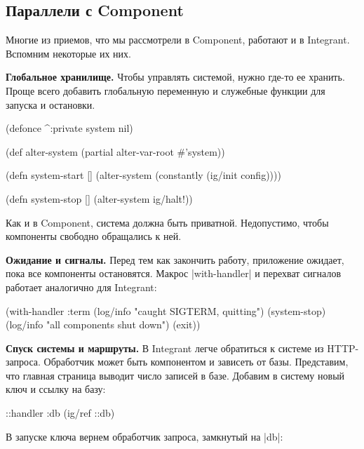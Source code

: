 \subsection{Параллели с Component}

Многие из приемов, что мы рассмотрели в Component, работают и в
Integrant. Вспомним некоторые их них.

\textbf{Глобальное хранилище.} Чтобы управлять системой, нужно где-то ее
хранить. Проще всего добавить глобальную переменную и служебные функции для
запуска и остановки.

\begin{english}
  \begin{clojure}
(defonce ^:private system nil)

(def alter-system (partial alter-var-root #'system))

(defn system-start []
  (alter-system (constantly (ig/init config))))

(defn system-stop []
  (alter-system ig/halt!))
  \end{clojure}
\end{english}

Как и в Component, система должна быть приватной. Недопустимо, чтобы
компоненты свободно обращались к ней.

\textbf{Ожидание и сигналы.} Перед тем как закончить работу, приложение ожидает,
пока все компоненты остановятся. Макрос \spverb|with-handler| и перехват
сигналов работает аналогично для Integrant:

\begin{english}
  \begin{clojure}
(with-handler :term
  (log/info "caught SIGTERM, quitting")
  (system-stop)
  (log/info "all components shut down")
  (exit))
  \end{clojure}
\end{english}

\textbf{Спуск системы и маршруты.} В Integrant легче обратиться к системе из
HTTP-запроса. Обработчик может быть компонентом и зависеть от базы. Представим,
что главная страница выводит число записей в базе. Добавим в систему новый ключ
и ссылку на базу:

\begin{english}
  \begin{clojure}
{::handler {:db (ig/ref ::db)}}
  \end{clojure}
\end{english}

В запуске ключа вернем обработчик запроса, замкнутый на \spverb|db|:

